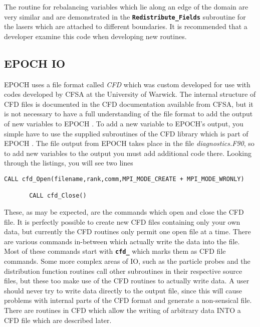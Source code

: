 \documentclass[12pt]{article}
\newcommand{\simpleboxverbatim}{\begin{Verbatim}[obeytabs=true,frame=single,
  framerule=0.5mm,rulecolor=\color{warwickmid}]}
\newcommand{\inlinecode}[1]{{\color{warwickred} \bf\texttt{#1}}}
\newcommand{\EPOCH}{{\color{warwickdark}\fontfamily{phv}\selectfont EPOCH} }
\begin{document}
The routine for rebalancing variables which lie along an edge of the domain are
very similar and are demonstrated in the \inlinecode{Redistribute\_Fields}
subroutine for the lasers which are attached to different boundaries. It is
recommended that a developer examine this code when developing new routines.

\subsection{\EPOCH IO}

\EPOCH uses a file format called {\it CFD} which was custom developed for use
with codes developed by CFSA at the University of Warwick. The internal
structure of CFD files is documented in the CFD documentation available from
CFSA, but it is not necessary to have a full understanding of the file format
to add the output of new variables to \EPOCH. To add a new variable to EPOCH's
output, you simple have to use the supplied subroutines of the CFD library
which is part of \EPOCH. The file output from \EPOCH takes place in the file
{\it diagnostics.F90}, so to add new variables to the output you must add
additional code there. Looking through the listings, you will see two lines

\simpleboxverbatim
       CALL cfd_Open(filename,rank,comm,MPI_MODE_CREATE + MPI_MODE_WRONLY)

       CALL cfd_Close()
\end{Verbatim}

These, as may be expected, are the commands which open and close the CFD
file. It is perfectly possible to create new CFD files containing only your own
data, but currently the CFD routines only permit one open file at a time. There
are various commands in-between which actually write the data into the
file. Most of these commands start with \inlinecode{cfd\_} which marks them as
CFD file commands. Some more complex areas of IO, such as the particle probes
and the distribution function routines call other subroutines in their
respective source files, but these too make use of the CFD routines to actually
write data. A user should never try to write data directly to the output file,
since this will cause problems with internal parts of the CFD format and
generate a non-sensical file. There are routines in CFD which allow the writing
of arbitrary data INTO a CFD file which are described later.
\end{document}
